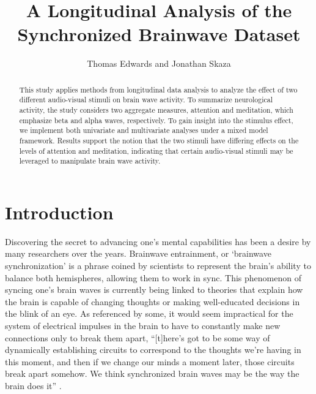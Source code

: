 \documentclass{article}[12pt]
\title{A Longitudinal Analysis of the Synchronized Brainwave Dataset}
\author{Thomas Edwards and Jonathan Skaza}
\begin{document}
\maketitle
\begin{abstract}
This study applies methods from longitudinal data analysis to analyze the effect of two different audio-visual stimuli on brain wave activity. To summarize neurological activity, the study considers two aggregate measures, attention and meditation, which emphasize beta and alpha waves, respectively. To gain insight into the stimulus effect, we implement both univariate and multivariate analyses under a mixed model framework. Results support the notion that the two stimuli have differing effects on the levels of attention and meditation, indicating that certain audio-visual stimuli may be leveraged to manipulate brain wave activity. 
\end{abstract}
\section{Introduction}

Discovering the secret to advancing one's mental capabilities has been a desire by many researchers over the years. Brainwave entrainment, or `brainwave synchronization' is a phrase coined by scientists to represent the brain's ability to balance both hemispheres, allowing them to work in sync. This phenomenon of syncing one's brain waves is currently being linked to theories that explain how the brain is capable of changing thoughts or making well-educated decisions in the blink of an eye. As referenced by some, it would seem impractical for the system of electrical impulses in the brain to have to constantly make new connections only to break them apart, ``[t]here's got to be some way of dynamically establishing circuits to correspond to the thoughts we're having in this moment, and then if we change our minds a moment later, those circuits break apart somehow. We think synchronized brain waves may be the way the brain does it'' \cite{trafton}. 
\end{document}

